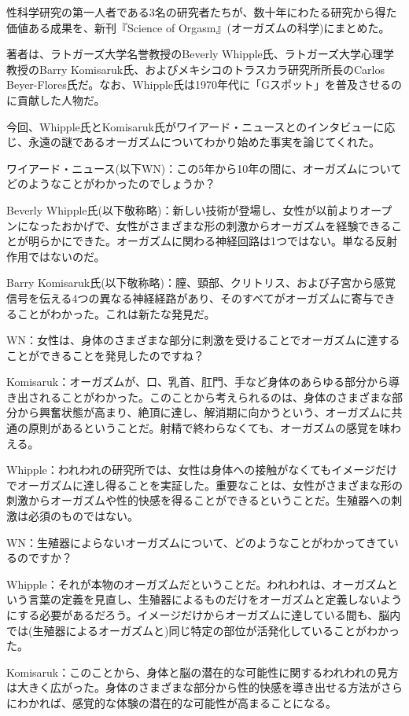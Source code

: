 性科学研究の第一人者である3名の研究者たちが、数十年にわたる研究から得た価値ある成果を、新刊『Science of Orgasm』(オーガズムの科学)にまとめた。

著者は、ラトガーズ大学名誉教授のBeverly Whipple氏、ラトガーズ大学心理学教授のBarry Komisaruk氏、およびメキシコのトラスカラ研究所所長のCarlos Beyer-Flores氏だ。なお、Whipple氏は1970年代に「Gスポット」を普及させるのに貢献した人物だ。

今回、Whipple氏とKomisaruk氏がワイアード・ニュースとのインタビューに応じ、永遠の謎であるオーガズムについてわかり始めた事実を論じてくれた。

ワイアード・ニュース(以下WN)：この5年から10年の間に、オーガズムについてどのようなことがわかったのでしょうか？

Beverly Whipple氏(以下敬称略)：新しい技術が登場し、女性が以前よりオープンになったおかげで、女性がさまざまな形の刺激からオーガズムを経験できることが明らかにできた。オーガズムに関わる神経回路は1つではない。単なる反射作用ではないのだ。

Barry Komisaruk氏(以下敬称略)：膣、頸部、クリトリス、および子宮から感覚信号を伝える4つの異なる神経経路があり、そのすべてがオーガズムに寄与できることがわかった。これは新たな発見だ。

WN：女性は、身体のさまざまな部分に刺激を受けることでオーガズムに達することができることを発見したのですね？

Komisaruk：オーガズムが、口、乳首、肛門、手など身体のあらゆる部分から導き出されることがわかった。このことから考えられるのは、身体のさまざまな部分から興奮状態が高まり、絶頂に達し、解消期に向かうという、オーガズムに共通の原則があるということだ。射精で終わらなくても、オーガズムの感覚を味わえる。

Whipple：われわれの研究所では、女性は身体への接触がなくてもイメージだけでオーガズムに達し得ることを実証した。重要なことは、女性がさまざまな形の刺激からオーガズムや性的快感を得ることができるということだ。生殖器への刺激は必須のものではない。

WN：生殖器によらないオーガズムについて、どのようなことがわかってきているのですか？

Whipple：それが本物のオーガズムだということだ。われわれは、オーガズムという言葉の定義を見直し、生殖器によるものだけをオーガズムと定義しないようにする必要があるだろう。イメージだけからオーガズムに達している間も、脳内では(生殖器によるオーガズムと)同じ特定の部位が活発化していることがわかった。

Komisaruk：このことから、身体と脳の潜在的な可能性に関するわれわれの見方は大きく広がった。身体のさまざまな部分から性的快感を導き出せる方法がさらにわかれば、感覚的な体験の潜在的な可能性が高まることになる。

